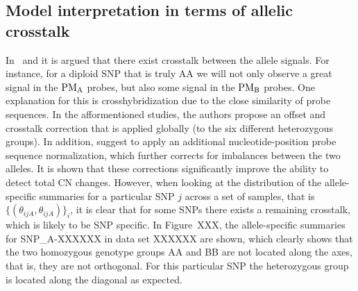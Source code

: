 \documentclass[10pt]{bmc_article}
\newenvironment{bmcformat}{\fussy\setboolean{publ}{true}}{\fussy}
\newcommand{\PMA}{\ensuremath{\textnormal{PM}_\textnormal{A}}\xspace}
\newcommand{\PMB}{\ensuremath{\textnormal{PM}_\textnormal{B}}\xspace}
\newenvironment{TODO}{\color{red}\textbf{TODO:}}{}
\begin{document}
\begin{bmcformat}

\subsection*{Model interpretation in terms of allelic crosstalk}
\label{secACCModel}
In~\cite{BengtssonH_etal_2008} and \cite{BengtssonH_etal_2009b} it is argued that there exist crosstalk between the allele signals.  For instance, for a diploid SNP that is truly AA we will not only observe a great signal in the \PMA probes, but also some signal in the \PMB probes.  One explanation for this is crosshybridization due to the close similarity of probe sequences.  In the afformentioned studies, the authors propose an offset and crosstalk correction that is applied globally (to the six different heterozygous groups).  In addition, \cite{BengtssonH_etal_2009b} suggest to apply an additional nucleotide-position probe sequence normalization, which further corrects for imbalances between the two alleles.  It is shown that these corrections significantly improve the ability to detect total CN changes.
However, when looking at the distribution of the allele-specific summaries for a particular SNP $j$ across a set of samples, that is $\{(\theta_{ijA},\theta_{ijA})\}_i$, it is clear that for some SNPs there exists a remaining crosstalk, which is likely to be SNP specific.  In Figure~XXX, the allele-specific summaries for SNP\_A-XXXXXX in data set XXXXXX are shown, which clearly shows that the two homozygous genotype groups AA and BB are not located along the axes, that is, they are not orthogonal. For this particular SNP the heterozygous group is located along the diagonal as expected.


\end{bmcformat}
\end{document}
